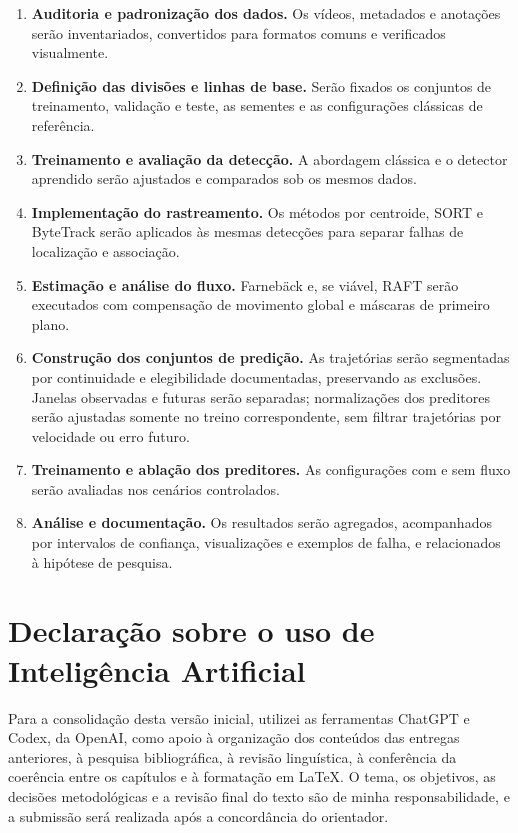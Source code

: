 \begin{enumerate}
	\item \textbf{Auditoria e padronização dos dados.} Os vídeos, metadados e anotações serão inventariados, convertidos para formatos comuns e verificados visualmente.

	\item \textbf{Definição das divisões e linhas de base.} Serão fixados os conjuntos de treinamento, validação e teste, as sementes e as configurações clássicas de referência.

	\item \textbf{Treinamento e avaliação da detecção.} A abordagem clássica e o detector aprendido serão ajustados e comparados sob os mesmos dados.

	\item \textbf{Implementação do rastreamento.} Os métodos por centroide, SORT e ByteTrack serão aplicados às mesmas detecções para separar falhas de localização e associação.

	\item \textbf{Estimação e análise do fluxo.} Farnebäck e, se viável, RAFT serão executados com compensação de movimento global e máscaras de primeiro plano.

	\item \textbf{Construção dos conjuntos de predição.} As trajetórias serão segmentadas por continuidade e elegibilidade documentadas, preservando as exclusões. Janelas observadas e futuras serão separadas; normalizações dos preditores serão ajustadas somente no treino correspondente, sem filtrar trajetórias por velocidade ou erro futuro.

	\item \textbf{Treinamento e ablação dos preditores.} As configurações com e sem fluxo serão avaliadas nos cenários controlados.

	\item \textbf{Análise e documentação.} Os resultados serão agregados, acompanhados por intervalos de confiança, visualizações e exemplos de falha, e relacionados à hipótese de pesquisa.
\end{enumerate}

\section{Declaração sobre o uso de Inteligência Artificial}

Para a consolidação desta versão inicial, utilizei as ferramentas ChatGPT e Codex, da OpenAI, como apoio à organização dos conteúdos das entregas anteriores, à pesquisa bibliográfica, à revisão linguística, à conferência da coerência entre os capítulos e à formatação em LaTeX. O tema, os objetivos, as decisões metodológicas e a revisão final do texto são de minha responsabilidade, e a submissão será realizada após a concordância do orientador.
